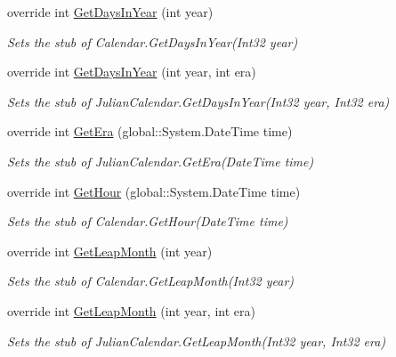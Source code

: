 \begin{DoxyCompactItemize}
override int \hyperlink{class_system_1_1_globalization_1_1_fakes_1_1_stub_julian_calendar_af8b5c80ca2a9ebf93aa972fa3db637df}{Get\-Days\-In\-Year} (int year)
\begin{DoxyCompactList}\small\item\em Sets the stub of Calendar.\-Get\-Days\-In\-Year(\-Int32 year)\end{DoxyCompactList}\item 
override int \hyperlink{class_system_1_1_globalization_1_1_fakes_1_1_stub_julian_calendar_aa4ffd1557beb37a28dcc8c2578dc695e}{Get\-Days\-In\-Year} (int year, int era)
\begin{DoxyCompactList}\small\item\em Sets the stub of Julian\-Calendar.\-Get\-Days\-In\-Year(\-Int32 year, Int32 era)\end{DoxyCompactList}\item 
override int \hyperlink{class_system_1_1_globalization_1_1_fakes_1_1_stub_julian_calendar_af6021874f686aabe3516dbd79266f766}{Get\-Era} (global\-::\-System.\-Date\-Time time)
\begin{DoxyCompactList}\small\item\em Sets the stub of Julian\-Calendar.\-Get\-Era(\-Date\-Time time)\end{DoxyCompactList}\item 
override int \hyperlink{class_system_1_1_globalization_1_1_fakes_1_1_stub_julian_calendar_abc9f03569f2fec51a816b15db26965ab}{Get\-Hour} (global\-::\-System.\-Date\-Time time)
\begin{DoxyCompactList}\small\item\em Sets the stub of Calendar.\-Get\-Hour(\-Date\-Time time)\end{DoxyCompactList}\item 
override int \hyperlink{class_system_1_1_globalization_1_1_fakes_1_1_stub_julian_calendar_a0fcfbc0fd3a72fc29946640fbb4778f7}{Get\-Leap\-Month} (int year)
\begin{DoxyCompactList}\small\item\em Sets the stub of Calendar.\-Get\-Leap\-Month(\-Int32 year)\end{DoxyCompactList}\item 
override int \hyperlink{class_system_1_1_globalization_1_1_fakes_1_1_stub_julian_calendar_a44bfe74955dbd5681a8fec2de96c0a30}{Get\-Leap\-Month} (int year, int era)
\begin{DoxyCompactList}\small\item\em Sets the stub of Julian\-Calendar.\-Get\-Leap\-Month(\-Int32 year, Int32 era)\end{DoxyCompactList}\item 

\end{DoxyCompactItemize}
